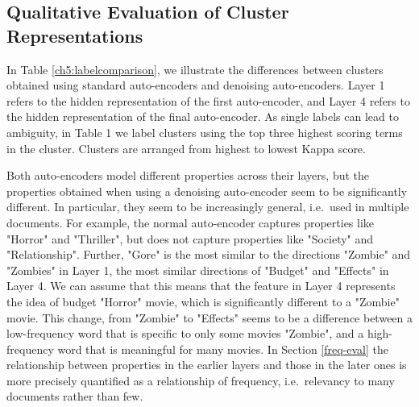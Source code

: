 \subsection{Qualitative Evaluation of Cluster Representations}\label{auto-encoder-qual}


 In Table \ref{ch5:labelcomparison}, we illustrate the differences between clusters obtained using standard auto-encoders and denoising auto-encoders. Layer 1 refers to the hidden representation of the first auto-encoder, and Layer 4 refers to the hidden representation of the final auto-encoder. As single labels can lead to ambiguity, in Table 1 we label clusters using the top three highest scoring terms in the cluster. Clusters are arranged from highest to lowest Kappa score. 

Both auto-encoders model different properties across their layers, but the properties obtained when using a denoising auto-encoder seem to be significantly different. In particular, they seem to be increasingly general, i.e.\ used in multiple documents. For example, the normal auto-encoder captures properties like "Horror" and "Thriller", but does not capture properties like "Society" and "Relationship". Further, "Gore"  is the  most similar to the directions "Zombie" and "Zombies" in Layer 1, the most similar directions of "Budget" and "Effects" in Layer 4. We can assume that this means that the feature in Layer 4 represents the  idea of budget "Horror" movie, which is significantly different to a "Zombie" movie. This change, from "Zombie" to "Effects" seems to be a difference between a low-frequency word that is specific to only some movies "Zombie", and a high-frequency word that is meaningful for many movies. In Section \ref{freq-eval} the relationship between properties in the earlier layers and those in the later ones is more precisely quantified as a relationship of frequency, i.e.\ relevancy to many documents rather than few.


